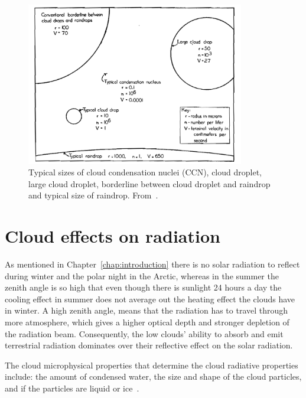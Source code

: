 \begin{figure}
\centering
\includegraphics[width=0.85\textwidth]{theory/dropletsize.png}
\caption{Typical sizes of cloud condensation nuclei (CCN), cloud droplet, large cloud droplet, borderline between cloud droplet and raindrop and typical size of raindrop.%
 From~\citep{McDonald1958}.}
\label{fig:dropletsize}
\end{figure}

\section{Cloud effects on radiation}
As mentioned in Chapter~\ref{chap:introduction} there is no solar radiation to reflect during winter and the polar night in the Arctic, whereas in the summer the zenith angle is so high that even though there is sunlight 24 hours a day the cooling effect in summer does not average out the heating effect the clouds have in winter. A high zenith angle, means that the radiation has to travel through more atmosphere, which gives a higher optical depth and stronger depletion of the radiation beam. Consequently, the low clouds' ability to absorb and emit terrestrial radiation dominates over their reflective effect on the solar radiation.

The cloud microphysical properties that determine the cloud radiative properties include: the amount of condensed water, the size and shape of the cloud particles, and if the particles are liquid or ice~\citep{Curry1996}.

